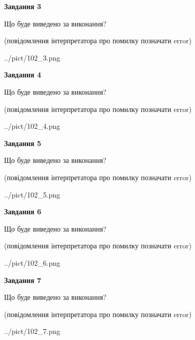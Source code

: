 \documentclass[12pt, ukrainian]{article}
\begin{document}
{\begin {large}
{\begin {center}\textbf{Завдання 3}\end {center}}\par
Що буде виведено за виконання?\par
 (повідомлення інтерпретатора про помилку позначати error)\par
\begin{center}
	{../pict/102_3.png}
\end{center}
\newpage

{\begin {center}\textbf{Завдання 4}\end {center}}\par
Що буде виведено за виконання?\par
 (повідомлення інтерпретатора про помилку позначати error)\par
\begin{center}
	{../pict/102_4.png}
\end{center}
\newpage

{\begin {center}\textbf{Завдання 5}\end {center}}\par
Що буде виведено за виконання?\par
 (повідомлення інтерпретатора про помилку позначати error)\par
\begin{center}
	{../pict/102_5.png}
\end{center}
\newpage

{\begin {center}\textbf{Завдання 6}\end {center}}\par
Що буде виведено за виконання?\par
 (повідомлення інтерпретатора про помилку позначати error)\par
\begin{center}
	{../pict/102_6.png}
\end{center}
\newpage

{\begin {center}\textbf{Завдання 7}\end {center}}\par
Що буде виведено за виконання?\par
 (повідомлення інтерпретатора про помилку позначати error)\par
\begin{center}
	{../pict/102_7.png}
\end{center}
\newpage


\end{large}}
\end{document}
